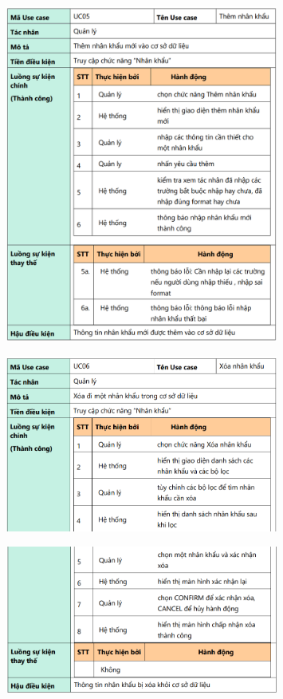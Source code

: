 \documentclass{article}
\begin{document}
\begin{itemize}
\begin{figure}[H]
        \includegraphics[width=0.8\textwidth]{Ảnh chương 2/UC05.png}
    \end{figure}
    \begin{figure}[H]
        \centering
        \includegraphics[width=0.8\textwidth]{Ảnh chương 2/UC06 1.png}
    \end{figure}
    \begin{figure}[H]
        \centering
        \includegraphics[width=0.8\textwidth]{Ảnh chương 2/UC06.png}

\end{figure}
\end{itemize}
\end{document}
